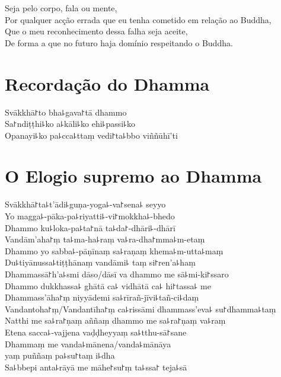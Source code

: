 Seja pelo corpo, fala ou mente,\\
Por qualquer acção errada que eu tenha cometido em relação ao Buddha,\\
Que o meu reconhecimento dessa falha seja aceite,\\
De forma a que no futuro haja domínio respeitando o Buddha.

\clearpage

\chapter*{Recordação do Dhamma}

\delegateSetUseNext

\begin{leader}
\end{leader}

Svākkhā꜓to bha꜕gava꜓tā dhammo\\
Sa꜓ndiṭṭhi꜕ko a꜕kāli꜕ko ehi꜕passi꜕ko\\
Opanayi꜕ko pa꜕cca꜕ttaṃ vedi꜓ta꜕bbo viññūhī'ti

\chapter*{O Elogio supremo ao Dhamma}

\begin{leader}
\end{leader}

Svākkhā꜓ta꜕t'ādi꜕guṇa-yoga꜕-va꜓sena꜕ seyyo\\
Yo magga꜕-pāka-pa꜕riyatti꜕-vi꜓mokkha꜕-bhedo\\
Dhammo ku꜕loka-pa꜕ta꜓nā ta꜕da꜓-dhāri꜕-dhārī\\
Vandām'aha꜓ṃ ta꜕ma-ha꜕raṃ va꜕ra-dha꜓mma꜕m-etaṃ\\
Dhammo yo sabba꜕-pāṇīnaṃ sa꜕raṇaṃ khema꜕m-utta꜕maṃ\\
Du꜕tiyānussa꜕tiṭṭhānaṃ vandāmi꜕ taṃ si꜓ren'a꜕haṃ\\
Dhammassā꜓h'a꜕smi dāso/dāsī va dhammo me sā꜕mi-ki꜓ssaro\\
Dhammo dukkhassa꜕ ghātā ca꜕ vidhātā ca꜕ hi꜓tassa꜕ me\\
Dhammass'āha꜓ṃ niyyādemi sa꜕rīrañ-jīvi꜕tañ-ci꜕daṃ\\
Vandantoha꜓ṃ/Vandantīha꜓ṃ ca꜕rissāmi dhammass'eva꜕ su꜓dhamma꜕taṃ\\
Natthi me sa꜕ra꜓ṇaṃ aññaṃ dhammo me sa꜕ra꜓ṇaṃ va꜕raṃ\\
Etena sacca꜕-vajjena vaḍḍheyyaṃ sa꜕tthu-sā꜓sane\\
Dhammaṃ me vanda꜕mānena/vanda꜕mānāya\\
\vin yaṃ puññaṃ pa꜕su꜓taṃ i꜕dha\\
Sa꜕bbepi anta꜕rāyā me māhe꜓su꜓ṃ ta꜕ssa꜓ teja꜕sā

